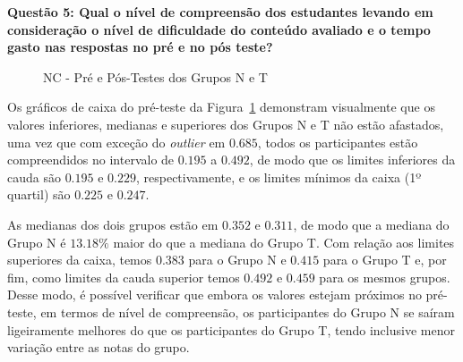 \textbf{Questão 5: Qual o nível de compreensão dos estudantes levando em consideração o nível de dificuldade do conteúdo avaliado e o tempo gasto nas respostas no pré e no pós teste?}

\begin{figure}[htb]
	\centering
	\captionsetup{justification=centering}
	\caption{NC - Pré e Pós-Testes dos Grupos N e T}
	\label{fig:F1_NC_H02}
\end{figure}

Os gráficos de caixa do pré-teste da Figura~\ref{fig:F1_NC_H02} demonstram visualmente que os valores inferiores, medianas e superiores dos Grupos N e T não estão afastados, uma vez que com exceção do \textit{outlier} em $0.685$, todos os participantes estão compreendidos no intervalo de $0.195$ a $0.492$,  de modo que os limites inferiores da cauda são $0.195$ e $0.229$, respectivamente, e os limites mínimos da caixa (1º quartil) são $0.225$ e $0.247$.

As medianas dos dois grupos estão em $0.352$ e $0.311$, de modo que a mediana do Grupo N é $13.18\%$ maior do que a mediana do Grupo T. Com relação aos limites superiores da caixa, temos $0.383$ para o Grupo N e $0.415$ para o Grupo T e, por fim, como limites da cauda superior temos $0.492$ e $0.459$ para os mesmos grupos. Desse modo, é possível verificar que embora os valores estejam próximos no pré-teste, em termos de nível de compreensão, os participantes do Grupo N se saíram ligeiramente melhores do que os participantes do Grupo T, tendo inclusive menor variação entre as notas do grupo.

